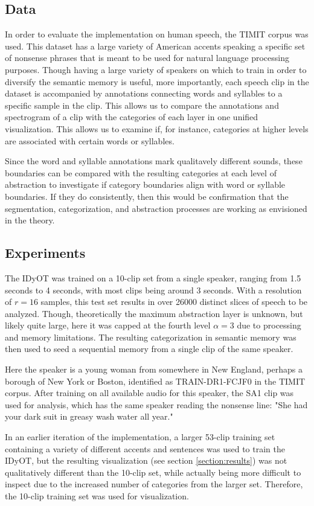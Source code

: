\subsection{Data}
\label{section:data}

In order to evaluate the implementation on human speech, the TIMIT corpus \citep{garofolo1993darpa} was used.  This dataset has a large variety of American accents speaking a specific set of nonsense phrases that is meant to be used for natural language processing purposes.  Though having a large variety of speakers on which to train in order to diversify the semantic memory is useful, more importantly, each speech clip in the dataset is accompanied by annotations connecting words and syllables to a specific sample in the clip.  This allows us to compare the annotations and spectrogram of a clip with the categories of each layer in one unified visualization.  This allows us to examine if, for instance, categories at higher levels are associated with certain words or syllables.  

Since the word and syllable annotations mark qualitavely different sounds, these boundaries can be compared with the resulting categories at each level of abstraction to investigate if category boundaries align with word or syllable boundaries. If they do consistently, then this would be confirmation that the segmentation, categorization, and abstraction processes are working as envisioned in the theory. 

\subsection{Experiments}
\label{section:experiments}

The IDyOT was trained on a 10-clip set from a single speaker, ranging from 1.5 seconds to 4 seconds, with most clips being around 3 seconds.  With a resolution of $r=16$ samples, this test set results in over 26000 distinct slices of speech to be analyzed.  Though, theoretically the maximum abstraction layer is unknown, but likely quite large, here it was capped at the fourth level $\alpha = 3$ due to processing and memory limitations.  The resulting categorization in semantic memory was then used to seed a sequential memory from a single clip of the same speaker.

Here the speaker is a young woman from somewhere in New England, perhaps a borough of New York or Boston, identified as TRAIN-DR1-FCJF0 in the TIMIT corpus.  After training on all available audio for this speaker, the SA1 clip was used for analysis, which has the same speaker reading the nonsense line: "She had your dark suit in greasy wash water all year."

In an earlier iteration of the implementation, a larger 53-clip training set containing a variety of different accents and sentences was used to train the IDyOT, but the resulting visualization (see section \ref{section:results}) was not qualitatively different than the 10-clip set, while actually being more difficult to inspect due to the increased number of categories from the larger set.  Therefore, the 10-clip training set was used for visualization.
